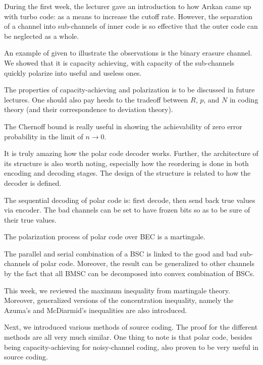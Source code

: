 \begin{summary}{1}
    During the first week, the lecturer gave an introduction to how Ar{\i}kan came up with turbo code: as a means to increase the cutoff rate. However, the separation of a channel into sub-channels of inner code is so effective that the outer code can be neglected as a whole. 
    
    An example of given to illustrate the observations is the binary erasure channel. We showed that it is capacity achieving, with capacity of the sub-channels quickly polarize into useful and useless ones.

    The properties of capacity-achieving and polarization is to be discussed in future lectures. One should also pay heeds to the tradeoff between $R$, $p$, and $N$ in coding theory (and their correspondence to deviation theory).
\end{summary}

\begin{summary}{2}
    The Chernoff bound is really useful in showing the achievability of zero error probability in the limit of $n\rightarrow 0$.

    It is truly amazing how the polar code decoder works. Further, the architecture of its structure is also worth noting, especially how the reordering is done in both encoding and decoding stages. The design of the structure is related to how the decoder is defined.
\end{summary}

\begin{summary}{3}
    The sequential decoding of polar code is: first decode, then send back true values via encoder. The bad channels can be set to have frozen bits so as to be sure of their true values.

    The polarization process of polar code over BEC is a martingale.

    The parallel and serial combination of a BSC is linked to the good and bad sub-channels of polar code. Moreover, the result can be generalized to other channels by the fact that all BMSC can be decomposed into convex combination of BSCs.
\end{summary}

\begin{summary}{4}
    This week, we reviewed the maximum inequality from martingale theory. Moreover, generalized versions of the concentration inequality, namely the Azuma's and McDiarmid's inequalities are also introduced.

    Next, we introduced various methods of source coding. The proof for the different methods are all very much similar. One thing to note is that polar code, besides being capacity-achieving for noisy-channel coding, also proven to be very useful in source coding.
\end{summary}


